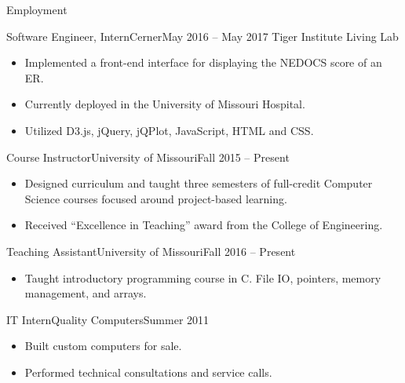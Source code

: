 \documentclass[]{mcdowellcv}
\begin{document}
\begin{cvsection}{Employment}
		\begin{cvsubsection}{Software Engineer, Intern}{Cerner}{May 2016 -- May 2017}
			Tiger Institute Living Lab			
			\begin{itemize}
				\item Implemented a front-end interface for displaying the NEDOCS score of an ER.
				\item Currently deployed in the University of Missouri Hospital.
				\item Utilized D3.js, jQuery, jQPlot, JavaScript, HTML and CSS.
			\end{itemize}
		\end{cvsubsection}
		
		\begin{cvsubsection}{Course Instructor}{University of Missouri}{Fall 2015 -- Present}
			\begin{itemize}
				\item Designed curriculum and taught three semesters of full-credit Computer Science courses focused around project-based learning.
				\item Received “Excellence in Teaching” award from the College of Engineering.
			\end{itemize}
		\end{cvsubsection}
		
		\begin{cvsubsection}{Teaching Assistant}{University of Missouri}{Fall 2016 -- Present}
			\begin{itemize}
				\item Taught introductory programming course in C. File IO, pointers, memory management, and arrays.
			\end{itemize}
		\end{cvsubsection}
		
		\begin{cvsubsection}{IT Intern}{Quality Computers}{Summer 2011}	
			\begin{itemize}
				\item Built custom computers for sale.
				\item Performed technical consultations and service calls.
			\end{itemize}
		\end{cvsubsection}
	\end{cvsection}	
	
\end{document}
